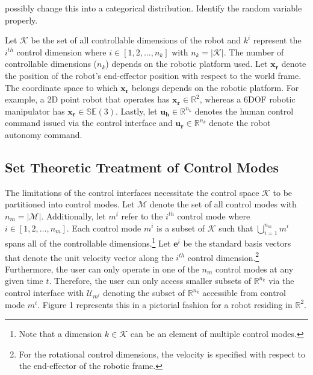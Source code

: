 \documentclass[conference]{IEEEtran}
\begin{document}
possibly change this into a categorical distribution. Identify the random variable properly. 

Let $\mathcal{K}$ be the set of all controllable dimensions of the robot and $k^i$ represent the $i^{th}$ control dimension where $i \in [1,2,\dots,n_k]$ with $n_k = \vert\mathcal{K}\vert$. The number of controllable dimensions ($n_k$) depends on the robotic platform used. Let $\boldsymbol{x_r}$ denote the position of the robot's end-effector position with respect to the world frame. The coordinate space to which $\boldsymbol{x_r}$ belongs depends on the robotic platform. For example, a 2D point robot that operates has $\boldsymbol{x_r} \in \mathbb{R}^2$, whereas a 6DOF robotic manipulator has $\boldsymbol{x_r} \in \mathbb{SE}(3)$. Lastly, let $\boldsymbol{u_h} \in \mathbb{R}^{n_k}$ denotes the human control command issued via the control interface and $\boldsymbol{u_r} \in \mathbb{R}^{n_k}$ denote the robot autonomy command. 

\subsection{Set Theoretic Treatment of Control Modes}

The limitations of the control interfaces necessitate the control space $\mathcal{K}$ to be partitioned into control modes. Let $\mathcal{M}$ denote the set of all control modes with $n_m = \vert\mathcal{M}\vert$. Additionally, let $m^i$ refer to the $i^{th}$ control mode where $i \in [1,2,\dots,n_m]$. Each control mode $m^i$ is a subset of $\mathcal{K}$ such that $\bigcup\limits_{i=1}^{n_m} m^i$ spans all of the controllable dimensions.\footnote{Note that a dimension $k \in \mathcal{K}$ can be an element of multiple control modes.} Let $\boldsymbol{e}^i$ be the standard basis vectors that denote the unit velocity vector along the $i^{th}$ control dimension.\footnote{For the rotational control dimensions, the velocity is specified with respect to the end-effector of the robotic frame.} Furthermore, the user can only operate in one of the $n_m$ control modes at any given time $t$. Therefore, the user can only access smaller subsets of $\mathbb{R}^{n_k}$ via the control interface with $\mathcal{U}_{m^i}$ denoting the subset of $\mathbb{R}^{n_k}$ accessible from control mode $m^i$. Figure 1 represents this in a pictorial fashion for a robot residing in $\mathbb{R}^2$. 



\end{document}
